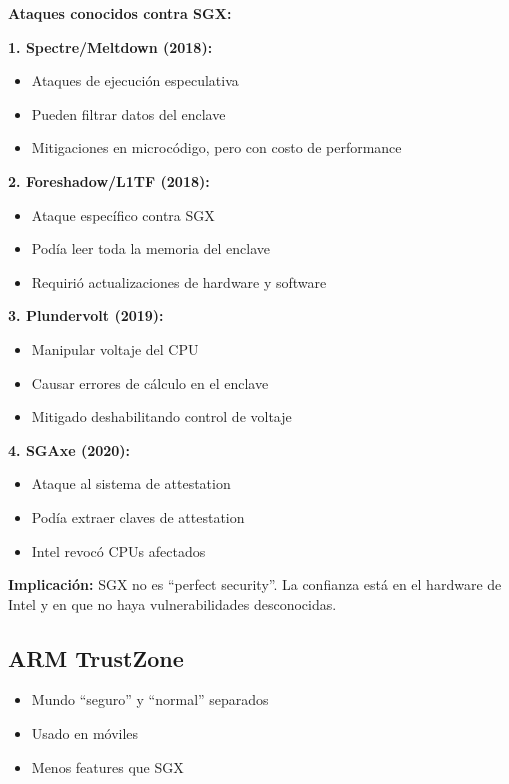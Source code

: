 \documentclass[11pt,a4paper,twoside]{book}
\begin{document}
\begin{remark}
\textbf{Ataques conocidos contra SGX:}

\textbf{1. Spectre/Meltdown (2018):}
\begin{itemize}
    \item Ataques de ejecuci\'on especulativa
    \item Pueden filtrar datos del enclave
    \item Mitigaciones en microc\'odigo, pero con costo de performance
\end{itemize}

\textbf{2. Foreshadow/L1TF (2018):}
\begin{itemize}
    \item Ataque espec\'ifico contra SGX
    \item Pod\'ia leer toda la memoria del enclave
    \item Requiri\'o actualizaciones de hardware y software
\end{itemize}

\textbf{3. Plundervolt (2019):}
\begin{itemize}
    \item Manipular voltaje del CPU
    \item Causar errores de c\'alculo en el enclave
    \item Mitigado deshabilitando control de voltaje
\end{itemize}

\textbf{4. SGAxe (2020):}
\begin{itemize}
    \item Ataque al sistema de attestation
    \item Pod\'ia extraer claves de attestation
    \item Intel revoc\'o CPUs afectados
\end{itemize}

\textbf{Implicaci\'on:} SGX no es ``perfect security''. La confianza est\'a en el hardware de Intel y en que no haya vulnerabilidades desconocidas.
\end{remark}

\subsection{ARM TrustZone}

\begin{itemize}
    \item Mundo ``seguro'' y ``normal'' separados
    \item Usado en m\'oviles
    \item Menos features que SGX
\end{itemize}
\end{document}
